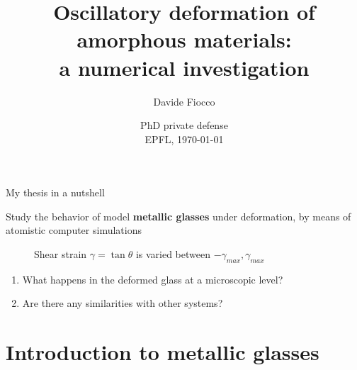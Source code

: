 \documentclass[compress]{beamer}
\title{Oscillatory deformation of amorphous materials: \\ a numerical investigation}
\author{Davide Fiocco}
\date{PhD private defense \\ \vspace{0.5cm} EPFL, \today}
\begin{document}
	
	\begin{frame}
		\titlepage
	\end{frame}
	
	\begin{frame}{My thesis in a nutshell}
	
		 Study the behavior of model \textbf{metallic glasses} under deformation, by means of atomistic computer simulations
	
		\begin{figure}
			\caption{Shear strain $\gamma = \tan \theta$ is varied between $-\gamma_{max}, \gamma_{max}$}
		\end{figure}
	
		\begin{enumerate}
			\item<2-> What happens in the deformed glass at a microscopic level? \\
			\item<3-> Are there any similarities with other systems?\\
		\end{enumerate}
		
	\end{frame}
	
	\section{Introduction to metallic glasses}
	
\end{document}
